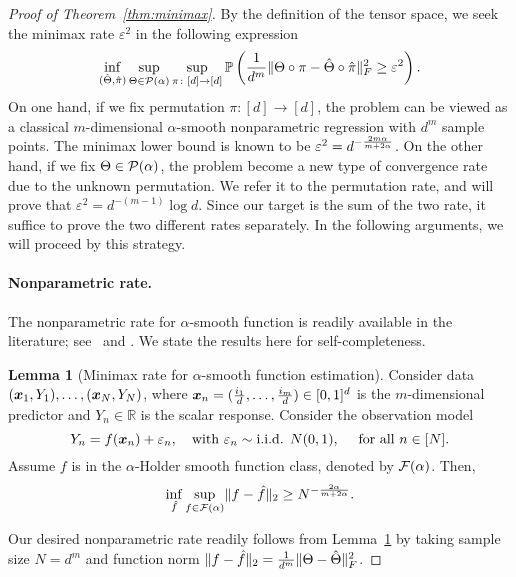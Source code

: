 \documentclass[11pt]{article}
\theoremstyle{definition}
\newtheorem{lem}[thm]{Lemma}
\begin{document}
\begin{proof}[Proof of Theorem~\ref{thm:minimax}] By the definition of the tensor space, we seek the minimax rate $\varepsilon^2$ in the following expression
\[
\inf_{(\hat \Theta,\hat \pi)}\sup_{\Theta\in \mathcal{P}(\alpha)}\sup_{\pi\colon [d]\to[d]} \mathbb{P}\left({1\over d^m}\lVert\Theta\circ \pi-\hat \Theta\circ \hat \pi\rVert_F^2 \geq \varepsilon^2 \right).
\]
On one hand, if we fix permutation $\pi\colon[d]\to[d]$, the problem can be viewed as a classical $m$-dimensional $\alpha$-smooth nonparametric regression with $d^m$ sample points. The minimax lower bound is known to be $\varepsilon^2=d^{-{2m\alpha\over m+2\alpha}}$. On the other hand, if we fix $\Theta\in\mathcal{P}(\alpha)$, the problem become a new type of convergence rate due to the unknown permutation. We refer it to the permutation rate, and will prove that $\varepsilon^2=d^{-(m-1)}\log d$. Since our target is the sum of the two rate, it suffice to prove the two different rates separately. In the following arguments, we will proceed by this strategy. 

\paragraph{Nonparametric rate.} The nonparametric rate for $\alpha$-smooth function is readily available in the literature; see \citet[Example 16]{Wassermantext}~and \citet[Section 2]{stone1982optimal}. We state the results here for self-completeness. 

\begin{lem}[Minimax rate for $\alpha$-smooth function estimation]\label{lem:non} Consider data $(\bm x_1,Y_1), \ldots, (\bm x_N,Y_N)$, where $\bm x_n=({i_1\over d},\ldots,{i_m\over d})\in[0,1]^d$ is the $m$-dimensional predictor and $Y_n\in\mathbb{R}$ is the scalar response. Consider the observation model
\[
Y_n=f(\mx_n)+\varepsilon_n,\quad \text{with}\ \varepsilon_n \sim \text{i.i.d. }  N(0,1), \quad\text{ for all }n\in[N].
\]
Assume $f$ is in the $\alpha$-Holder smooth function class, denoted by $\mathcal{F}(\alpha)$. Then,
\begin{equation}\label{eq:non}
\inf_{\hat f}\sup_{f\in \mathcal{F}(\alpha)}\lVert f-\hat f\rVert_2\geq N^{-{2\alpha\over m+2\alpha}}.
\end{equation}
\end{lem}
Our desired nonparametric rate readily follows from Lemma~\ref{lem:non} by taking sample size $N=d^m$ and function norm $\lVert f-\hat f\rVert_2={1\over d^m}\lVert\Theta-\hat \Theta\rVert_F^2$.


\end{proof}
\end{document}
